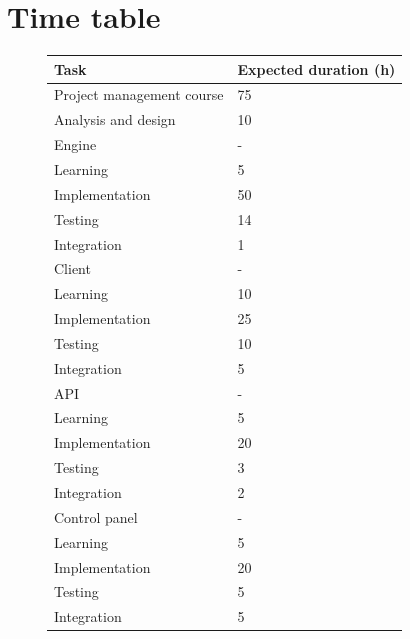 \documentclass[a4paper,11pt,titlepage,abstract,numbers=noenddot,automark,mnsy,intlimits,rgb,dvipsnames]{report}
\begin{document}
\section{Time table}
\begin{figure}[H]
\begin{center}
\begin{tabular}{l | l}
\textbf{Task} & \textbf{Expected duration (h)}\\
\hline
Project management course & 75\\
\hline
Analysis and design & 10\\
\hline
Engine & -\\
\hspace{1em}
Learning & 5\\
\hspace{1em}
Implementation & 50\\
\hspace{1em}
Testing & 14\\
\hspace{1em}
Integration & 1\\
\hline
Client & -\\
\hspace{1em}
Learning & 10\\
\hspace{1em}
Implementation & 25\\
\hspace{1em}
Testing & 10\\
\hspace{1em}
Integration & 5\\
\hline
API & -\\
\hspace{1em}
Learning & 5\\
\hspace{1em}
Implementation & 20\\
\hspace{1em}
Testing & 3\\
\hspace{1em}
Integration & 2\\
\hline
Control panel & -\\
\hspace{1em}
Learning & 5\\
\hspace{1em}
Implementation & 20\\
\hspace{1em}
Testing & 5\\
\hspace{1em}
Integration & 5\\

\end{tabular}
\end{center}
\end{figure}
\end{document}
